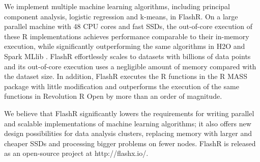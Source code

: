 We implement multiple machine learning algorithms, including principal component
analysis, logistic regression and k-means, in FlashR. On a large parallel machine
with 48 CPU cores and fast SSDs, the out-of-core execution of these R implementations
achieves performance comparable to their in-memory execution, while significantly
outperforming the same algorithms in H2O \cite{h2o} and Spark MLlib
\cite{spark}. FlashR effortlessly scales to datasets with billions
of data points and its out-of-core execution uses a negligible amount of memory
compared with the dataset size. In addition, FlashR executes the R functions
in the R MASS \cite{mass} package with little modification and outperforms
the execution of the same functions in Revolution R Open \cite{rro} by more
than an order of magnitude.

We believe that FlashR significantly lowers the requirements for writing
parallel and scalable implementations of machine learning algorithms; it also
offers new
design possibilities for data analysis clusters, replacing memory with larger
and cheaper SSDs and processing bigger problems on fewer nodes.
FlashR is released as an open-source project at http://flashx.io/.
